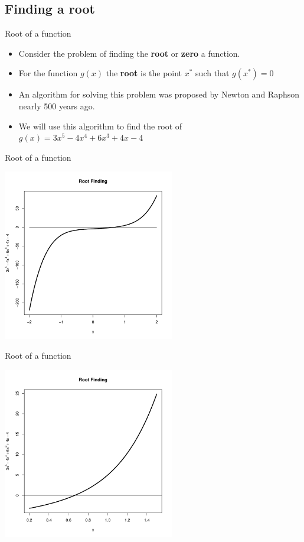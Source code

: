 \documentclass[10pt]{beamer}
\begin{document}
\subsection{Finding a root}
\begin{frame}{Root of a function}
  \begin{itemize}\item Consider the problem of finding the {\bf root} or {\bf zero} a function.

  \item For the function $g(x)$ the {\bf root} is the point $x^*$ such that $g(x^*)=0$

  \item An algorithm for solving this problem was proposed by Newton and Raphson nearly 500 years ago.

  \item We will use this algorithm to find the root of $g(x)=3x^5-4x^4+6x^3+4x-4$
  \end{itemize}
\end{frame}
\begin{frame}{Root of a function}
  \begin{center}
    \includegraphics[height=7.5cm]{RCode/rfout.pdf}
  \end{center}
\end{frame}
\begin{frame}{Root of a function}
  \begin{center}
    \includegraphics[height=7.5cm]{RCode/rf1.pdf}
  \end{center}
\end{frame}
\end{document}
